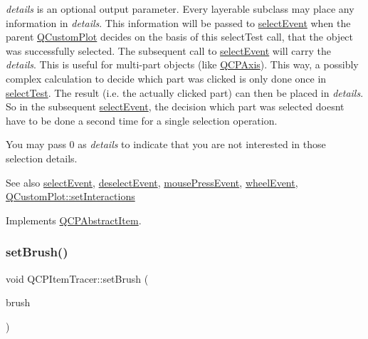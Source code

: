 {\itshape details} is an optional output parameter. Every layerable subclass may place any information in {\itshape details}. This information will be passed to \hyperlink{class_q_c_p_abstract_item_aa4b969c58797f39c9c0b6c07c7869d17}{select\+Event} when the parent \hyperlink{class_q_custom_plot}{Q\+Custom\+Plot} decides on the basis of this select\+Test call, that the object was successfully selected. The subsequent call to \hyperlink{class_q_c_p_abstract_item_aa4b969c58797f39c9c0b6c07c7869d17}{select\+Event} will carry the {\itshape details}. This is useful for multi-\/part objects (like \hyperlink{class_q_c_p_axis}{Q\+C\+P\+Axis}). This way, a possibly complex calculation to decide which part was clicked is only done once in \hyperlink{class_q_c_p_item_tracer_a9fd955fea40e977d66f3a9fd5765aec4}{select\+Test}. The result (i.\+e. the actually clicked part) can then be placed in {\itshape details}. So in the subsequent \hyperlink{class_q_c_p_abstract_item_aa4b969c58797f39c9c0b6c07c7869d17}{select\+Event}, the decision which part was selected doesn\textquotesingle{}t have to be done a second time for a single selection operation.

You may pass 0 as {\itshape details} to indicate that you are not interested in those selection details.

\begin{DoxySeeAlso}{See also}
\hyperlink{class_q_c_p_abstract_item_aa4b969c58797f39c9c0b6c07c7869d17}{select\+Event}, \hyperlink{class_q_c_p_abstract_item_af9093798cb07a861dcc73f93ca16c0c1}{deselect\+Event}, \hyperlink{class_q_c_p_layerable_af6567604818db90f4fd52822f8bc8376}{mouse\+Press\+Event}, \hyperlink{class_q_c_p_layerable_a47dfd7b8fd99c08ca54e09c362b6f022}{wheel\+Event}, \hyperlink{class_q_custom_plot_a5ee1e2f6ae27419deca53e75907c27e5}{Q\+Custom\+Plot\+::set\+Interactions} 
\end{DoxySeeAlso}


Implements \hyperlink{class_q_c_p_abstract_item_ae41d0349d68bb802c49104afd100ba2a}{Q\+C\+P\+Abstract\+Item}.

\mbox{\label{class_q_c_p_item_tracer_a2c303f7470a30084daa201ed556b3c36}} 
\subsubsection{\texorpdfstring{set\+Brush()}{setBrush()}}
{\footnotesize\ttfamily void Q\+C\+P\+Item\+Tracer\+::set\+Brush (\begin{DoxyParamCaption}\item[{const Q\+Brush \&}]{brush }\end{DoxyParamCaption})}

